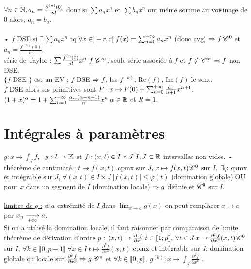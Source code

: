 \documentclass[12 pt]{book}
\begin{document}
$\forall n\in\mathbb{N}, a_n = \frac{S^{(n)}(0)}{n!}$ donc si $\sum a_n x^n$ et $\sum b_n x^n$ ont même somme au voisinage de 0 alors, $a_n=b_n$.\\
\text{}\\
• $f$ DSE si $\exists \, \sum a_n x^n$ tq $\forall x\in ]-r,r[ \; f(x) = \sum_{n=0}^{+\infty} a_n x^n$ (donc cvg) $\Rightarrow f \; \mathscr{C}^0$ et $a_n = \frac{f^{(n)}(0)}{n!}$.\\
\underline{série de Taylor :} $\sum \frac{f^{(n}(0)}{n!}x^n \ f \; \mathscr{C}^\infty$, seule série associée à $f$ et $f\notin\mathscr{C}^\infty \Rightarrow f$ non DSE.\\
$\{ f$ DSE $\}$ est un EV ; $f$ DSE $\Rightarrow \bar{f}$, les $f^{(k)}$, Re$(f)$, Im$(f)$ le sont.\\
$f$ DSE alors ses primitives sont $F:x\mapsto F(0) + \sum_{n=0}^{+\infty} \frac{a_n}{n+1} x^{n+1}$.\\
$(1+x)^\alpha = 1 + \sum_{n=1}^{+\infty} \frac{\alpha \dots (\alpha-n+1)}{n!} x^n \; \alpha\in\mathbb{R}$ et $R=1$.\\

\section*{Intégrales à paramètres}

$g : x\mapsto \int_J f$, \ $g:I\to \mathbb{K}$ et $f:(x,t)\in I\times J \ I,J\subset \mathbb{R}$ intervalles non vides.\/
• \underline{théorème de continuité :} $t\mapsto f(x,t)$ cpmx sur $J, \, x\mapsto f(x,t) \, \mathscr{C}^0$ sur $I, \; \exists \varphi$ cpmx et intégrable sur $J$, $\forall (x,t)\in I\times J \; |f(x,t)|\leqslant \varphi(t)$ (domination globale) OU pour $x$ dans un segment de $I$ (domination locale) $\Rightarrow g$ définie et $\mathscr{C}^0$ sur $I$.\\
\text{}\\
\underline{limites de $g$ :} si $a$ extrémité de $I$ dans $\lim_{x\to a} g(x)$ on peut remplacer $x\to a$ par $x_n\xrightarrow[+\infty]{} a$.\\
Si on a utilisé la domination locale, il faut raisonner par comparaison de limite.\\
\underline{théorème de dérivation d'ordre $p$ :} $(x,t) \mapsto \frac{\partial^i f}{\partial x^i} \; i\in\llbracket 1;p\rrbracket, \; \forall t\in J \, x\mapsto \frac{\partial^p f}{\partial x^p}(x,t) \, \mathscr{C}^0$ sur $I$, $\forall k\in\llbracket 0,p-1\rrbracket \ \forall x\in I \ t\mapsto \frac{\partial^k f}{\partial x^k}(x,t)$ cpmx et intégrable sur $J$, domination globale ou locale sur $\frac{\partial^p f}{\partial x^p} \Ra g \ \sC^p$ et $\forall k\in \llbracket 0,p\rrbracket, \ g^{(k)} : x\mapsto \int_J \frac{\partial^k f}{\partial x^k}$ .\\
\end{document}
